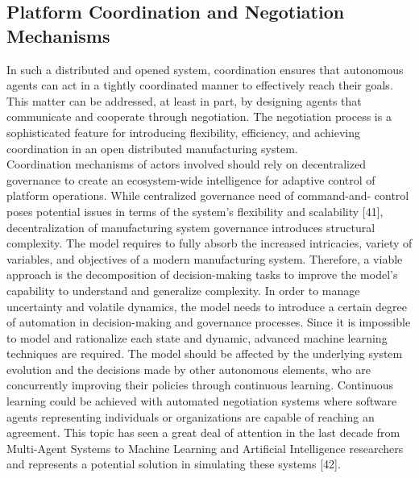 \subsection{Platform Coordination and Negotiation Mechanisms}
In such a distributed and opened system, coordination ensures that autonomous agents can act in a tightly coordinated manner to effectively reach their goals. This matter can be addressed, at least in part, by designing agents that communicate and cooperate through negotiation. The negotiation process is a sophisticated feature for introducing flexibility, efficiency, and achieving coordination in an open distributed manufacturing system.\\
Coordination mechanisms of actors involved should rely on decentralized governance to create an ecosystem-wide intelligence for adaptive control of platform operations. While centralized governance need of command-and- control poses potential issues in terms of the system’s flexibility and scalability [41], decentralization of manufacturing system governance introduces structural complexity. The model requires to fully absorb the increased intricacies, variety of variables, and objectives of a modern manufacturing system. Therefore, a viable approach is the decomposition of decision-making tasks to improve the model's capability to understand and generalize complexity. In order to manage uncertainty and volatile dynamics, the model needs to introduce a certain degree of automation in decision-making and governance processes. Since it is impossible to model and rationalize each state and dynamic, advanced machine learning techniques are required. The model should be affected by the underlying system evolution and the decisions made by other autonomous elements, who are concurrently improving their policies through continuous learning. Continuous learning could be achieved with automated negotiation systems where software agents representing individuals or organizations are capable of reaching an agreement. This topic has seen a great deal of attention in the last decade from Multi-Agent Systems to Machine Learning and Artificial Intelligence researchers and represents a potential solution in simulating these systems [42].\\
